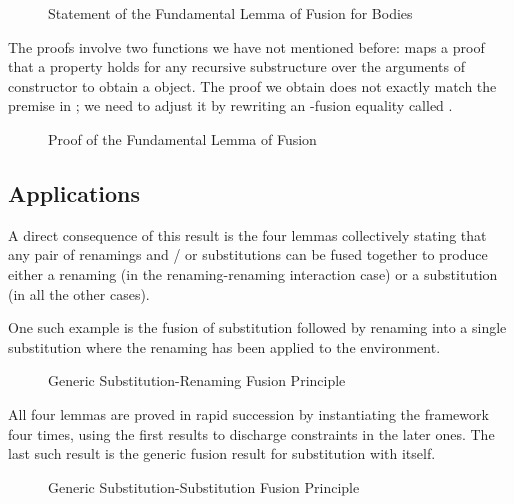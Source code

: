 \begin{figure}[h]
\caption{Statement of the Fundamental Lemma of Fusion for Bodies\label{fig:fusiontype}}
\end{figure}

The proofs involve two functions we have not mentioned before:  maps a proof that
a property holds for any recursive substructure over the arguments of constructor to
obtain a  object. The proof we obtain does not exactly match the premise in
; we need to adjust it by rewriting an -fusion equality called
.

\begin{figure}[h]
\caption{Proof of the Fundamental Lemma of Fusion}
\end{figure}

\subsection{Applications}

A direct consequence of this result is the four lemmas collectively stating
that any pair of renamings and / or substitutions can be fused together to
produce either a renaming (in the renaming-renaming interaction case) or a
substitution (in all the other cases).

One such example is the fusion of substitution followed by renaming into a
single substitution where the renaming has been applied to the environment.

\begin{figure}[h]
\caption{Generic Substitution-Renaming Fusion Principle}
\end{figure}

All four lemmas are proved in rapid succession by instantiating the 
framework four times, using the first results to discharge constraints in the
later ones. The last such result is the generic fusion result for substitution
with itself.

\begin{figure}[h]
\caption{Generic Substitution-Substitution Fusion Principle}
\end{figure}

